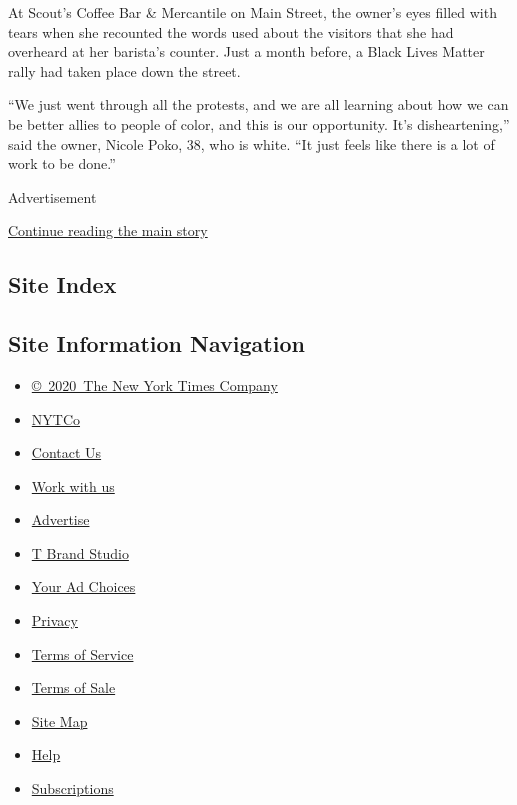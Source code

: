 At Scout's Coffee Bar \& Mercantile on Main Street, the owner's eyes
filled with tears when she recounted the words used about the visitors
that she had overheard at her barista's counter. Just a month before, a
Black Lives Matter rally had taken place down the street.

``We just went through all the protests, and we are all learning about
how we can be better allies to people of color, and this is our
opportunity. It's disheartening,'' said the owner, Nicole Poko, 38, who
is white. ``It just feels like there is a lot of work to be done.''

Advertisement

\protect\hyperlink{after-bottom}{Continue reading the main story}

\hypertarget{site-index}{%
\subsection{Site Index}\label{site-index}}

\hypertarget{site-information-navigation}{%
\subsection{Site Information
Navigation}\label{site-information-navigation}}

\begin{itemize}
\tightlist
\item
  \href{https://help.nytimes3xbfgragh.onion/hc/en-us/articles/115014792127-Copyright-notice}{©~2020~The
  New York Times Company}
\end{itemize}

\begin{itemize}
\tightlist
\item
  \href{https://www.nytco.com/}{NYTCo}
\item
  \href{https://help.nytimes3xbfgragh.onion/hc/en-us/articles/115015385887-Contact-Us}{Contact
  Us}
\item
  \href{https://www.nytco.com/careers/}{Work with us}
\item
  \href{https://nytmediakit.com/}{Advertise}
\item
  \href{http://www.tbrandstudio.com/}{T Brand Studio}
\item
  \href{https://www.nytimes3xbfgragh.onion/privacy/cookie-policy\#how-do-i-manage-trackers}{Your
  Ad Choices}
\item
  \href{https://www.nytimes3xbfgragh.onion/privacy}{Privacy}
\item
  \href{https://help.nytimes3xbfgragh.onion/hc/en-us/articles/115014893428-Terms-of-service}{Terms
  of Service}
\item
  \href{https://help.nytimes3xbfgragh.onion/hc/en-us/articles/115014893968-Terms-of-sale}{Terms
  of Sale}
\item
  \href{https://spiderbites.nytimes3xbfgragh.onion}{Site Map}
\item
  \href{https://help.nytimes3xbfgragh.onion/hc/en-us}{Help}
\item
  \href{https://www.nytimes3xbfgragh.onion/subscription?campaignId=37WXW}{Subscriptions}
\end{itemize}
